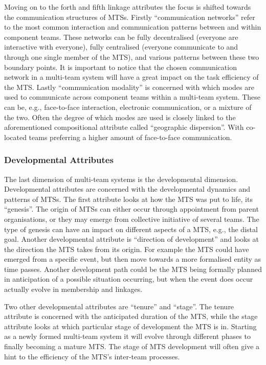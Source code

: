 Moving on to the forth and fifth linkage attributes the focus is shifted towards the communication structures of MTSs. Firstly ``communication networks'' refer to the most common interaction and communication patterns between and within component teams. These networks can be fully decentralised (everyone are interactive with everyone), fully centralised (everyone communicate to and through one single member of the MTS), and various patterns between these two boundary points. It is important to notice that the chosen communication network in a multi-team system will have a great impact on the task efficiency of the MTS. Lastly ``communication modality'' is concerned with which modes are used to communicate across component teams within a multi-team system. These can be, e.g., face-to-face interaction, electronic communication, or a mixture of the two. Often the degree of which modes are used is closely linked to the aforementioned compositional attribute called ``geographic dispersion''. With co-located teams preferring a higher amount of face-to-face communication.

\subsubsection{Developmental Attributes}

The last dimension of multi-team systems is the developmental dimension. Developmental attributes are concerned with the developmental dynamics and patterns of MTSs. The first attribute looks at how the MTS was put to life, its ``genesis''. The origin of MTSs can either occur through appointment from parent organisations, or they may emerge from collective initiative of several teams. The type of genesis can have an impact on different aspects of a MTS, e.g., the distal goal. Another developmental attribute is ``direction of development'' and looks at the direction the MTS takes from its origin. For example the MTS could have emerged from a specific event, but then move towards a more formalised entity as time passes. Another development path could be the MTS being formally planned in anticipation of a possible situation occurring, but when the event does occur actually evolve in membership and linkages.

Two other developmental attributes are ``tenure'' and ``stage''. The tenure attribute is concerned with the anticipated  duration of the MTS, while the stage attribute looks at which particular stage of development the MTS is in. Starting as a newly formed multi-team system it will evolve through different phases to finally becoming a mature MTS. The stage of MTS development will often give a hint to the efficiency of the MTS's inter-team processes. 

